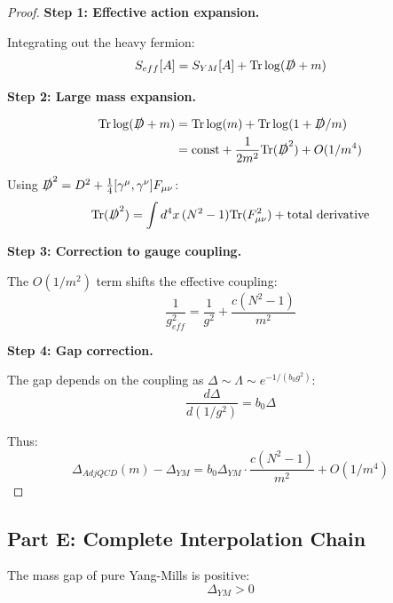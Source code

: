 \begin{proof}
\textbf{Step 1: Effective action expansion.}

Integrating out the heavy fermion:
\begin{equation}
S_{eff}[A] = S_{YM}[A] + \mathrm{Tr}\log(\slashed{D} + m)
\end{equation}

\textbf{Step 2: Large mass expansion.}

\begin{align}
\mathrm{Tr}\log(\slashed{D} + m) &= \mathrm{Tr}\log(m) + \mathrm{Tr}\log(1 + \slashed{D}/m) \\
&= \text{const} + \frac{1}{2m^2}\mathrm{Tr}(\slashed{D}^2) + O(1/m^4)
\end{align}

Using $\slashed{D}^2 = D^2 + \frac{1}{4}[\gamma^\mu, \gamma^\nu]F_{\mu\nu}$:
\begin{equation}
\mathrm{Tr}(\slashed{D}^2) = \int d^4x \, (N^2-1) \mathrm{Tr}(F_{\mu\nu}^2) + \text{total derivative}
\end{equation}

\textbf{Step 3: Correction to gauge coupling.}

The $O(1/m^2)$ term shifts the effective coupling:
\begin{equation}
\frac{1}{g_{eff}^2} = \frac{1}{g^2} + \frac{c(N^2-1)}{m^2}
\end{equation}

\textbf{Step 4: Gap correction.}

The gap depends on the coupling as $\Delta \sim \Lambda \sim e^{-1/(b_0 g^2)}$:
\begin{equation}
\frac{d\Delta}{d(1/g^2)} = b_0 \Delta
\end{equation}

Thus:
\begin{equation}
\Delta_{AdjQCD}(m) - \Delta_{YM} = b_0 \Delta_{YM} \cdot \frac{c(N^2-1)}{m^2} + O(1/m^4)
\end{equation}
\end{proof}

\subsection{Part E: Complete Interpolation Chain}

\begin{theorem}
\label{thm:adjoint-complete-126}
The mass gap of pure Yang-Mills is positive:
\begin{equation}
\boxed{\Delta_{YM} > 0}
\end{equation}
\end{theorem}

